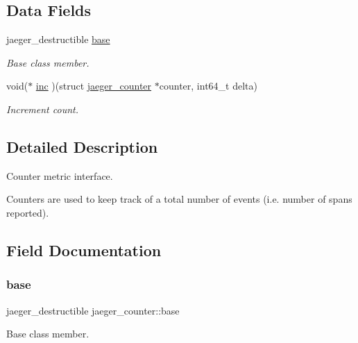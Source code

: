 \subsection*{Data Fields}
\begin{DoxyCompactItemize}
\item 
jaeger\+\_\+destructible \mbox{\hyperlink{structjaeger__counter_abc889348825fd450db8b207dbfb17777}{base}}
\begin{DoxyCompactList}\small\item\em Base class member. \end{DoxyCompactList}\item 
void($\ast$ \mbox{\hyperlink{structjaeger__counter_a349dc48bc8872abe4b73246c8be49aca}{inc}} )(struct \mbox{\hyperlink{structjaeger__counter}{jaeger\+\_\+counter}} $\ast$counter, int64\+\_\+t delta)
\begin{DoxyCompactList}\small\item\em Increment count. \end{DoxyCompactList}\end{DoxyCompactItemize}


\subsection{Detailed Description}
Counter metric interface. 

Counters are used to keep track of a total number of events (i.\+e. number of spans reported). 

\subsection{Field Documentation}
\mbox{\label{structjaeger__counter_abc889348825fd450db8b207dbfb17777}} 
\subsubsection{\texorpdfstring{base}{base}}
{\footnotesize\ttfamily jaeger\+\_\+destructible jaeger\+\_\+counter\+::base}



Base class member. 

\mbox{\label{structjaeger__counter_a349dc48bc8872abe4b73246c8be49aca}} 
